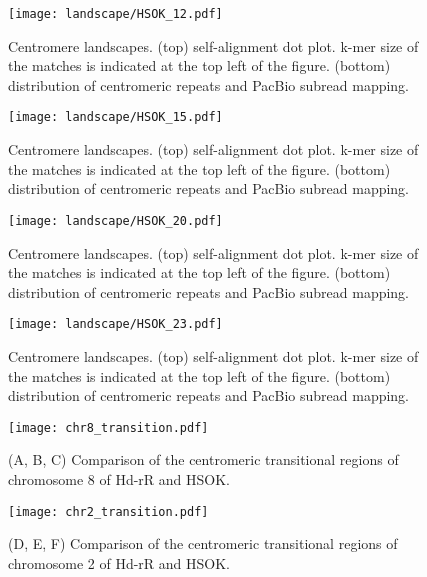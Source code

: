 \addtocounter{figure}{-1}
\begin{figure}[p]
  \centering
  \texttt{[image: landscape/HSOK\_12.pdf]}
  \caption{
    Centromere landscapes. (top) self-alignment dot plot. k-mer size of the matches is indicated at the top left of the figure. (bottom) distribution of centromeric repeats and PacBio subread mapping.
  }
  \label{centromere_landscape}
\end{figure}

\addtocounter{figure}{-1}
\begin{figure}[p]
  \centering
  \texttt{[image: landscape/HSOK\_15.pdf]}
  \caption{
    Centromere landscapes. (top) self-alignment dot plot. k-mer size of the matches is indicated at the top left of the figure. (bottom) distribution of centromeric repeats and PacBio subread mapping.
  }
  \label{centromere_landscape}
\end{figure}

\addtocounter{figure}{-1}
\begin{figure}[p]
  \centering
  \texttt{[image: landscape/HSOK\_20.pdf]}
  \caption{
    Centromere landscapes. (top) self-alignment dot plot. k-mer size of the matches is indicated at the top left of the figure. (bottom) distribution of centromeric repeats and PacBio subread mapping.
  }
  \label{centromere_landscape}
\end{figure}

\addtocounter{figure}{-1}
\begin{figure}[p]
  \centering
  \texttt{[image: landscape/HSOK\_23.pdf]}
  \caption{
    Centromere landscapes. (top) self-alignment dot plot. k-mer size of the matches is indicated at the top left of the figure. (bottom) distribution of centromeric repeats and PacBio subread mapping.
  }
  \label{centromere_landscape}
\end{figure}


\begin{figure}[p]
  \centering
  \texttt{[image: chr8\_transition.pdf]}
  \caption{
    (A, B, C) Comparison of the centromeric transitional regions of chromosome 8 of Hd-rR and HSOK.
  }
  \label{other_chroms_transition}
\end{figure}

\addtocounter{figure}{-1}
\begin{figure}[p]
  \centering
  \texttt{[image: chr2\_transition.pdf]}
  \caption{
    (D, E, F) Comparison of the centromeric transitional regions of chromosome 2 of Hd-rR and HSOK.
  }
\end{figure}
